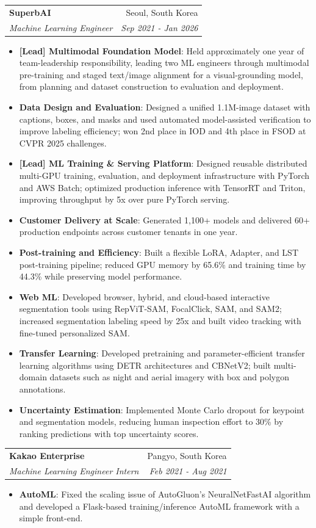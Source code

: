 \documentclass[letterpaper,11pt]{article}
\makeatletter
\newcommand{\resumeItem}[2]{
  \item\small{
    \textbf{#1}{: #2 \vspace{-2pt}}
  }
}
\newcommand{\resumeSubheading}[4]{
  \vspace{-1pt}\item
    \begin{tabular*}{0.97\textwidth}{l@{\extracolsep{\fill}}r}
      \textbf{#1} & #2 \\
      \textit{\small#3} & \textit{\small #4} \\
    \end{tabular*}\vspace{-5pt}
}
\newcommand{\resumeItemListStart}{\begin{itemize}}
\newcommand{\resumeItemListEnd}{\end{itemize}\vspace{-5pt}}
\makeatother
\begin{document}
    \resumeSubheading
      {SuperbAI}{Seoul, South Korea}
      {Machine Learning Engineer}{Sep 2021 - Jan 2026}
      \resumeItemListStart
        \resumeItem{[Lead] Multimodal Foundation Model}
          {Held approximately one year of team-leadership responsibility, leading two ML engineers through multimodal pre-training and staged text/image alignment for a visual-grounding model, from planning and dataset construction to evaluation and deployment.}
        \resumeItem{Data Design and Evaluation}
          {Designed a unified 1.1M-image dataset with captions, boxes, and masks and used automated model-assisted verification to improve labeling efficiency; won 2nd place in IOD and 4th place in FSOD at CVPR 2025 challenges.}
        \resumeItem{[Lead] ML Training \& Serving Platform}
          {Designed reusable distributed multi-GPU training, evaluation, and deployment infrastructure with PyTorch and AWS Batch; optimized production inference with TensorRT and Triton, improving throughput by 5x over pure PyTorch serving.}
        \resumeItem{Customer Delivery at Scale}
          {Generated 1,100+ models and delivered 60+ production endpoints across customer tenants in one year.}
        \resumeItem{Post-training and Efficiency}
          {Built a flexible LoRA, Adapter, and LST post-training pipeline; reduced GPU memory by 65.6\% and training time by 44.3\% while preserving model performance.}
        \resumeItem{Web ML}
          {Developed browser, hybrid, and cloud-based interactive segmentation tools using RepViT-SAM, FocalClick, SAM, and SAM2; increased segmentation labeling speed by 25x and built video tracking with fine-tuned personalized SAM.}
        \resumeItem{Transfer Learning}
          {Developed pretraining and parameter-efficient transfer learning algorithms using DETR architectures and CBNetV2; built multi-domain datasets such as night and aerial imagery with box and polygon annotations.}
        \resumeItem{Uncertainty Estimation}
          {Implemented Monte Carlo dropout for keypoint and segmentation models, reducing human inspection effort to 30\% by ranking predictions with top uncertainty scores.}
      \resumeItemListEnd

    \resumeSubheading
      {Kakao Enterprise}{Pangyo, South Korea}
      {Machine Learning Engineer Intern}{Feb 2021 - Aug 2021}
      \resumeItemListStart
        \resumeItem{AutoML}
          {Fixed the scaling issue of AutoGluon's NeuralNetFastAI algorithm and developed a Flask-based training/inference AutoML framework with a simple front-end.}
      \resumeItemListEnd
\end{document}
